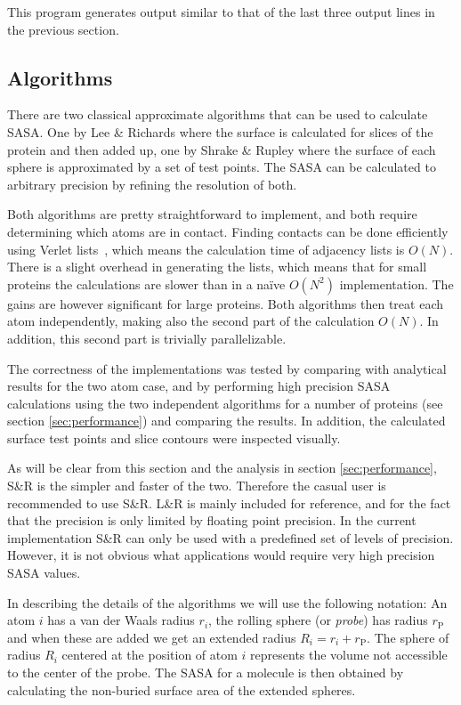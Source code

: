 \documentclass[a4paper,11pt]{article}
\begin{document}
This program generates output similar to that of the last three output
lines in the previous section.

\appendix

\begin{small}

\section{Algorithms}\label{sec:algorithm}

There are two classical approximate algorithms that can be used to
calculate SASA. One by Lee \& Richards \cite{LnR} where the surface is
calculated for slices of the protein and then added up, one by Shrake
\& Rupley \cite{SnR} where the surface of each sphere is approximated
by a set of test points. The SASA can be calculated to arbitrary
precision by refining the resolution of both. 

Both algorithms are pretty straightforward to implement, and both
require determining which atoms are in contact. Finding contacts can
be done efficiently using Verlet lists~\cite{Verlet}, which means the
calculation time of adjacency lists is $O(N)$. There is a slight
overhead in generating the lists, which means that for small proteins
the calculations are slower than in a na\"{i}ve $O(N^2)$
implementation. The gains are however significant for large
proteins. Both algorithms then treat each atom independently, making
also the second part of the calculation $O(N)$. In addition, this
second part is trivially parallelizable.

The correctness of the implementations was tested by comparing with
analytical results for the two atom case, and by performing high
precision SASA calculations using the two independent algorithms for a
number of proteins (see section \ref{sec:performance}) and comparing
the results. In addition, the calculated surface test points and slice
contours were inspected visually.

As will be clear from this section and the analysis in section
\ref{sec:performance}, S\&R is the simpler and faster of the
two. Therefore the casual user is recommended to use S\&R. L\&R is
mainly included for reference, and for the fact that the precision is
only limited by floating point precision. In the current
implementation S\&R can only be used with a predefined set of levels
of precision. However, it is not obvious what applications would
require very high precision SASA values.

In describing the details of the algorithms we will use the following
notation: An atom $i$ has a van der Waals radius $r_i$, the rolling
sphere (or \emph{probe}) has radius $r_\text{P}$ and when these are
added we get an extended radius $R_i = r_i + r_\text{P}$. The sphere
of radius $R_i$ centered at the position of atom $i$ represents the
volume not accessible to the center of the probe. The SASA for a
molecule is then obtained by calculating the non-buried surface area
of the extended spheres.


\end{small}
\end{document}
